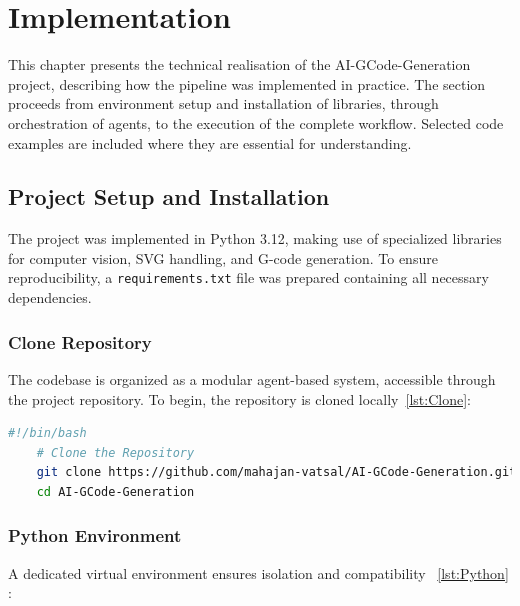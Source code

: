 




\chapter{Implementation}

This chapter presents the technical realisation of the AI-GCode-Generation project, describing how the pipeline was implemented in practice. The section proceeds from environment setup and installation of libraries, through orchestration of agents, to the execution of the complete workflow. Selected code examples are included where they are essential for understanding.

\section{Project Setup and Installation}
The project was implemented in Python 3.12, making use of specialized libraries for computer vision, SVG handling, and G-code generation. To ensure reproducibility, a \texttt{requirements.txt} file was prepared containing all necessary dependencies.

\subsection{Clone Repository}
The codebase is organized as a modular agent-based system, accessible through the project repository. To begin, the repository is cloned locally~\ref{lst:Clone}:

\begin{lstlisting}[language=bash,caption={Clone Repository}, label={lst:Clone}]
	#!/bin/bash
	# Clone the Repository
	git clone https://github.com/mahajan-vatsal/AI-GCode-Generation.git
	cd AI-GCode-Generation
\end{lstlisting}

\subsection{Python Environment}
A dedicated virtual environment ensures isolation and compatibility ~\ref{lst:Python} :

